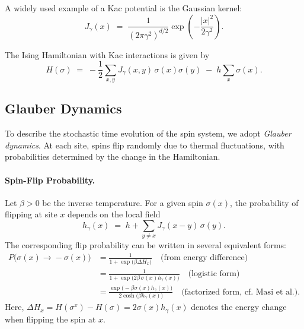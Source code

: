 \documentclass[11pt,a4paper]{article}
\begin{document}
A widely used example of a Kac potential is the Gaussian kernel:
\begin{equation}\label{eq:J-Gaussian}
J_\gamma(x) \;=\; \frac{1}{(2\pi\gamma^2)^{d/2}} 
\exp\!\left(-\frac{|x|^2}{2\gamma^2}\right).
\end{equation}

The Ising Hamiltonian with Kac interactions is given by
\begin{equation}\label{eq:H-Kac}
    H(\sigma) \;=\; -\frac{1}{2}\sum_{x,y} J_\gamma(x,y)\,\sigma(x)\sigma(y) \;-\; h \sum_{x} \sigma(x).
\end{equation}

\subsection{Glauber Dynamics}
\label{sec:glauber}
To describe the stochastic time evolution of the spin system, we adopt \emph{Glauber dynamics}. 
At each site, spins flip randomly due to thermal fluctuations, with probabilities determined by the change in the Hamiltonian.

\paragraph{Spin-Flip Probability.}  
Let $\beta > 0$ be the inverse temperature. 
For a given spin $\sigma(x)$, the probability of flipping at site $x$ depends on the local field
\begin{equation}\label{eq:hloc}
    h_{\gamma}(x) \;=\; h + \sum_{y\neq x} J_\gamma(x-y)\,\sigma(y).
\end{equation}
The corresponding flip probability can be written in several equivalent forms:
\begin{equation}\label{eq:flip-prob}
\begin{split}
    P\big(\sigma(x)\!\to\!-\sigma(x)\big) 
    &= \frac{1}{1 + \exp\!\big(\beta \Delta H_x\big)} 
        \quad \text{(from energy difference)} \\
    &= \frac{1}{1 + \exp\!\big(2\beta\,\sigma(x) h_{\gamma}(x)\big)} 
        \quad \text{(logistic form)} \\
    &= \frac{\exp\!\big(-\beta\sigma(x) h_{\gamma}(x)\big)}
            {2\cosh\!\big(\beta h_{\gamma}(x)\big)} 
        \quad \text{(factorized form, cf.~Masi et al.)}.
\end{split}
\end{equation}
Here, $\Delta H_x = H(\sigma^x) - H(\sigma) = 2\sigma(x)h_\gamma(x)$ denotes the energy change when flipping the spin at $x$.
\end{document}
